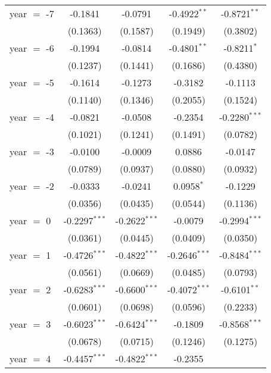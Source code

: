 \begin{tabular}{lcccc}
   year $=$ -7  & -0.1841         & -0.0791         & -0.4922$^{**}$  & -0.8721$^{**}$\\   
                & (0.1363)        & (0.1587)        & (0.1949)        & (0.3802)\\   
   year $=$ -6  & -0.1994         & -0.0814         & -0.4801$^{**}$  & -0.8211$^{*}$\\   
                & (0.1237)        & (0.1441)        & (0.1686)        & (0.4380)\\   
   year $=$ -5  & -0.1614         & -0.1273         & -0.3182         & -0.1113\\   
                & (0.1140)        & (0.1346)        & (0.2055)        & (0.1524)\\   
   year $=$ -4  & -0.0821         & -0.0508         & -0.2354         & -0.2280$^{***}$\\   
                & (0.1021)        & (0.1241)        & (0.1491)        & (0.0782)\\   
   year $=$ -3  & -0.0100         & -0.0009         & 0.0886          & -0.0147\\   
                & (0.0789)        & (0.0937)        & (0.0880)        & (0.0932)\\   
   year $=$ -2  & -0.0333         & -0.0241         & 0.0958$^{*}$    & -0.1229\\   
                & (0.0356)        & (0.0435)        & (0.0544)        & (0.1136)\\   
   year $=$ 0   & -0.2297$^{***}$ & -0.2622$^{***}$ & -0.0079         & -0.2994$^{***}$\\   
                & (0.0361)        & (0.0445)        & (0.0409)        & (0.0350)\\   
   year $=$ 1   & -0.4726$^{***}$ & -0.4822$^{***}$ & -0.2646$^{***}$ & -0.8484$^{***}$\\   
                & (0.0561)        & (0.0669)        & (0.0485)        & (0.0793)\\   
   year $=$ 2   & -0.6283$^{***}$ & -0.6600$^{***}$ & -0.4072$^{***}$ & -0.6101$^{**}$\\   
                & (0.0601)        & (0.0698)        & (0.0596)        & (0.2233)\\   
   year $=$ 3   & -0.6023$^{***}$ & -0.6424$^{***}$ & -0.1809         & -0.8568$^{***}$\\   
                & (0.0678)        & (0.0715)        & (0.1246)        & (0.1275)\\   
   year $=$ 4   & -0.4457$^{***}$ & -0.4822$^{***}$ & -0.2355         &   \\   

\end{tabular}
